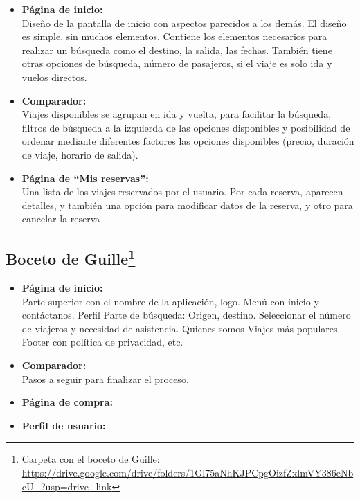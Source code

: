 \begin{itemize}
    \item\textbf{Página de inicio:} \\ Diseño de la pantalla de inicio con aspectos parecidos a los demás. El diseño es simple, sin muchos elementos. Contiene los elementos necesarios para realizar un búsqueda como el destino, la salida, las fechas. También tiene otras opciones de búsqueda, número de pasajeros, si el viaje es solo ida y vuelos directos.
    \item\textbf{Comparador:} \\ Viajes disponibles se agrupan en ida y vuelta, para facilitar la búsqueda, filtros de búsqueda a la izquierda de las opciones disponibles y posibilidad de ordenar mediante diferentes factores las opciones disponibles (precio, duración de viaje, horario de salida).
    \item\textbf{Página de ``Mis reservas'':} \\ Una lista de los viajes reservados por el usuario. Por cada reserva, aparecen detalles, y también una opción para modificar datos de la reserva, y otro para cancelar la reserva
    
\end{itemize}

\subsection[Boceto de Guille]{Boceto de Guille\footnote{Carpeta con el boceto de Guille: \url{https://drive.google.com/drive/folders/1Gl75aNhKJPCpgOizfZxlmVY386eNbcU_?usp=drive_link}}}

\begin{itemize}
    \item\textbf{Página de inicio:} \\ Parte superior con el nombre de la aplicación, logo. Menú con inicio y contáctanos. Perfil
    Parte de búsqueda: Origen, destino. Seleccionar el número de viajeros y necesidad de asistencia.
    Quienes somos
    Viajes más populares.
    Footer con política de privacidad, etc.
    
    \item\textbf{Comparador:} \\ Pasos a seguir para finalizar el proceso.
    \item\textbf{Página de compra:} \\ 
    \item\textbf{Perfil de usuario:} \\ 
\end{itemize}

